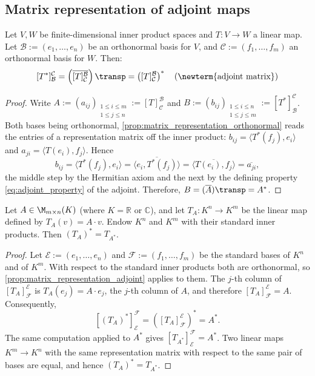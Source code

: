 \subsection*{Matrix representation of adjoint maps}

\begin{proposition}
\label{prop:matrix_representation_adjoint}
Let $V, W$ be finite-di\-men\-sional inner product spaces and $T \colon V \to W$ a linear map. Let $\mathcal{B} := (e_1, \dots, e_n)$ be an orthonormal basis for $V$, and $\mathcal{C} := (f_1, \dots, f_m)$ an orthonormal basis for $W$. Then:
\[
    [T^*]_{\mathcal{B}}^{\mathcal{C}} = \left( \overline{[T]_{\mathcal{C}}^{\mathcal{B}}} \right)\transp = \left([T]_{\mathcal{C}}^{\mathcal{B}}\right)^* \quad \text{(\newterm{adjoint matrix})}
\]
\end{proposition}

\begin{proof}
Write $A := (a_{ij})_{\substack{1 \leq i \leq m \\ 1 \leq j \leq n}} := [T]_{\mathcal{C}}^{\mathcal{B}}$ and $B := (b_{ij})_{\substack{1 \leq i \leq n \\ 1 \leq j \leq m}} := [T^*]_{\mathcal{B}}^{\mathcal{C}}$.
Both bases being orthonormal, \cref{prop:matrix_representation_orthonormal} reads the entries of a representation matrix off the inner product: $b_{ij} = \langle T^*(f_j), e_i \rangle$ and $a_{ji} = \langle T(e_i), f_j \rangle$. Hence
\[
    b_{ij} = \langle T^*(f_j), e_i \rangle = \overline{\langle e_i, T^*(f_j) \rangle} = \overline{\langle T(e_i), f_j \rangle} = \overline{a_{ji}},
\]
the middle step by the Hermitian axiom and the next by the defining property \eqref{eq:adjoint_property} of the adjoint.
Therefore, $B = (\overline{A})\transp = A^*$.
\end{proof}

\begin{corollary}
\label{cor:adjoint_matrix_map}
Let $A \in \M_{m \times n}(K)$ (where $K = \mathbb{R}$ or $\mathbb{C}$), and let $T_A \colon K^n \to K^m$ be the linear map defined by $T_A(v) = A \cdot v$. Endow $K^n$ and $K^m$ with their standard inner products. Then $(T_A)^* = T_{A^*}$.
\end{corollary}

\begin{proof}
Let $\mathcal{E} := (e_1, \dots, e_n)$ and $\mathcal{F} := (f_1, \dots, f_m)$ be the standard bases of $K^n$ and of $K^m$. With respect to the standard inner products both are orthonormal, so \cref{prop:matrix_representation_adjoint} applies to them. The $j$-th column of $[T_A]_{\mathcal{F}}^{\mathcal{E}}$ is $T_A(e_j) = A \cdot e_j$, the $j$-th column of $A$, and therefore $[T_A]_{\mathcal{F}}^{\mathcal{E}} = A$. Consequently,
\[
    [(T_A)^*]_{\mathcal{E}}^{\mathcal{F}} = \left( [T_A]_{\mathcal{F}}^{\mathcal{E}} \right)^* = A^*.
\]
The same computation applied to $A^*$ gives $[T_{A^*}]_{\mathcal{E}}^{\mathcal{F}} = A^*$. Two linear maps $K^m \to K^n$ with the same representation matrix with respect to the same pair of bases are equal, and hence $(T_A)^* = T_{A^*}$.
\end{proof}

